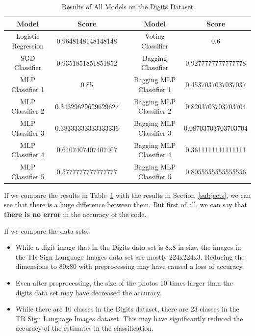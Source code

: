 \documentclass{article}
\begin{document}
\begin{flushleft}
\newpage
\begin{table}[h]
    \centering
    \begin{tabular}{c|c|c|c|c}
    \hline
        Model & Score && Model & Score \\
    \hline
        Logistic Regression & 0.9648148148148148 && Voting Classifier & 0.6 \\
        SGD Classifier & 0.9351851851851852 && Bagging Classifier & 0.9277777777777778 \\
        MLP Classifier 1 & 0.85 &&         Bagging MLP Classifier 1 & 0.4537037037037037 \\
        MLP Classifier 2 & 0.34629629629629627 && Bagging MLP Classifier 2 & 0.8203703703703704 \\
        MLP Classifier 3 & 0.38333333333333336 && Bagging MLP Classifier 3 & 0.08703703703703704 \\
        MLP Classifier 4 & 0.6407407407407407 && Bagging MLP Classifier 4 & 0.3611111111111111 \\
        MLP Classifier 5 & 0.5777777777777777 && Bagging MLP Classifier 5 & 0.8055555555555556 \\
    \hline
    \end{tabular}
    \caption{Results of All Models on the Digits Dataset}
    \label{tab:digits}
\end{table}

If we compare the results in Table~\ref{tab:digits} with the results in Section~\ref{subjects}, we can see that there is a huge difference between them. But first of all, we can say that \textbf{there is no error} in the accuracy of the code.

If we compare the data sets;
\begin{itemize}
    \item While a digit image that in the Digits data set is 8x8 in size, the images in the TR Sign Language Images data set are mostly 224x224x3. Reducing the dimensions to 80x80 with preprocessing may have caused a loss of accuracy.
    \item Even after preprocessing, the size of the photos 10 times larger than the digits data set may have decreased the accuracy.
    \item While there are 10 classes in the Digits dataset, there are 23 classes in the TR Sign Language Images dataset. This may have significantly reduced the accuracy of the estimates in the classification.
\end{itemize}


\end{flushleft}
\end{document}
